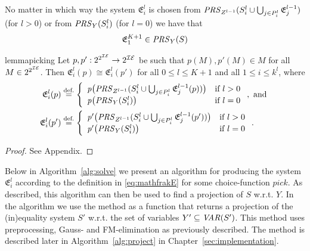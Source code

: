 \begin{cor}
No matter in which way the system $\mathfrak{E}^l_i$ is chosen from $\mathit{PRS}_{Z^{l-1}}(S^l_i \cup\bigcup_{j\in P^l_i}\mathfrak{E}^{l-1}_j)$ (for $l>0$) or from $\mathit{PRS}_{Y}(S^l_i)$ (for $l=0$) we have that 
\[
\mathfrak{E}^{K+1}_1 \in \mathit{PRS}_{Y}(S)
\]
\end{cor}
%
\begin{restatable}{lemma}{picking}\label{lm:picking}
Let $p,p':2^{2^{\mathcal{IE}}}\to 2^{\mathcal{IE}}$ be such that $p(M),p'(M)\in M$ for all $M\in 2^{2^{\mathcal{IE}}}$. Then $\mathfrak{E}^l_i(p)\cong\mathfrak{E}^l_i(p')$ for all $0\leq l\leq K+1$ and all $1\leq i\leq k^l$, where
\begin{align*}
\mathfrak{E}^l_i(p) &\overset{\text{def.}}= \left\{\begin{array}{ll}
		\mathit{p}\big(\mathit{PRS}_{Z^{l-1}}(S^l_i \cup\bigcup_{j\in P^l_i}\mathfrak{E}^{l-1}_j(p))\big) &\text{if }l>0\\
		\mathit{p}\big(\mathit{PRS}_{Y}(S^l_i)\big)&\text{if } l = 0
\end{array}\right.,\text{ and }\\
\mathfrak{E}^l_i(p') &\overset{\text{def.}}= \left\{\begin{array}{ll}
		\mathit{p'}\big(\mathit{PRS}_{Z^{l-1}}(S^l_i \cup\bigcup_{j\in P^l_i}\mathfrak{E}^{l-1}_j(p'))\big) &\text{if }l>0\\
		\mathit{p'}\big(\mathit{PRS}_{Y}(S^l_i)\big)&\text{if } l = 0
\end{array}\right..
\end{align*}
\end{restatable}
\begin{proof}
See Appendix.
\end{proof}
%
Below in Algorithm~\ref{alg:solve} we present an algorithm for producing the system $\mathfrak{E}^l_i$ according to the definition in \eqref{eq:mathfrakE} for some choice-function $\mathit{pick}$. As described, this algorithm can then be used to  find a projection of $S$ w.r.t. $Y$. In the algorithm we use the method  as a function that returns a projection of the (in)equality system $S'$ w.r.t. the set of variables $Y'\subseteq\mathit{VAR}(S')$. This method uses preprocessing, Gauss- and FM-elimination as previously described. The method is described later in Algorithm~\ref{alg:project} in Chapter~\ref{sec:implementation}. 

